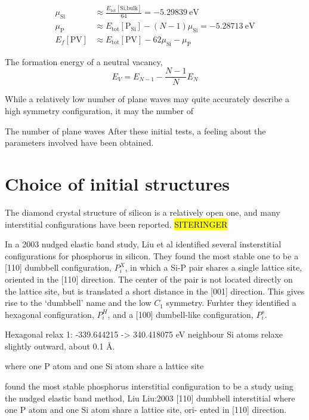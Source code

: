 \documentclass[11pt,bibliography=totoc,index=totoc]{scrbook}   %
\newcommand{\comment}[1]{\hl{#1}}
\begin{document}
\begin{align}
  \mu_{\text{Si}} &\approx \frac{E_{\text{tot}}[\text{Si,bulk}]}{64} = \SI{-5.29839}{\electronvolt} \\
  \mu_{\text{P}} &\approx E_{\text{tot}}[\text{P}_{\text{Si}}] - (N-1)\mu_{\text{Si}}
  = \SI{-5.28713}{\electronvolt}\\
  E_f[\text{PV}] &\approx E_{\text{tot}}[\text{PV}] - 62\mu_{\text{Si}} - \mu_{\text{P}}
\end{align}

The formation energy of a neutral vacancy,
\begin{equation}
  E_V = E_{N-1} - \frac{N-1}{N} E_N 
\end{equation}


While a relatively low number of plane waves 
may quite accurately describe a high symmetry configuration, it may 
the number of 

The number of plane waves 
After these initial tests, a feeling about the parameters involved have been obtained. 





\section{Choice of initial structures}\label{seq:initial-structures}

The diamond crystal structure of silicon is a relatively open one, and many interstitial configurations have been reported.
\comment{SITERINGER}

In a 2003 nudged elastic band study, Liu et al identified several insterstitial configurations for phosphorus in silicon.
They found the most stable one to be a [110] dumbbell configuration, $P_i^X$, in which a Si-P pair shares a single lattice site, oriented in the [110] direction. The center of the pair is not located directly on the lattice site, but is translated a short distance in the [001] direction. This gives rise to the `dumbbell' name and the low $C_1$ symmetry.
Furhter they identified a hexagonal configuration, $P_i^H$, and a [100] dumbell-like configuration, $P_i^s$.



Hexagonal relax 1: -339.644215 -> 340.418075 eV
neighbour Si atoms relaxe slightly outward, about 0.1 Å.

where one P atom and one Si atom share a lattice site

found the most stable phosphorus interstitial configuration to be a
 study using the nudged elastic band method, Liu 
Liu:2003
[110] dumbbell interstitial where one P atom and one Si atom share a lattice site, ori- ented in [110] direction.
\end{document}
